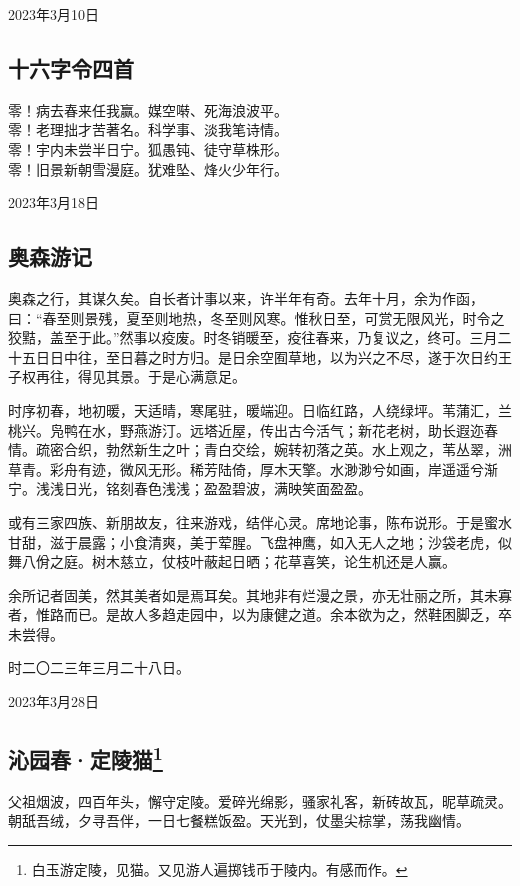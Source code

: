 \documentclass[a5paper]{ctexart}
\begin{document}
	\hfill 2023年3月10日
	
	
	\subsection{十六字令四首}
	\begin{center}
		零！病去春来任我赢。媒空啭、死海浪波平。\\
		零！老理拙才苦著名。科学事、淡我笔诗情。\\
		零！宇内未尝半日宁。狐愚钝、徒守草株形。\\
		零！旧景新朝雪漫庭。犹难坠、烽火少年行。
		
	\end{center}
	\hfill 2023年3月18日
	
	\subsection{奥森游记}
	奥森之行，其谋久矣。自长者计事以来，许半年有奇。去年十月，余为作函，曰：“春至则景残，夏至则地热，冬至则风寒。惟秋日至，可赏无限风光，时令之狡黠，盖至于此。”然事以疫废。时冬销暖至，疫往春来，乃复议之，终可。三月二十五日日中往，至日暮之时方归。是日余空囿草地，以为兴之不尽，遂于次日约王子权再往，得见其景。于是心满意足。
	
	时序初春，地初暖，天适晴，寒尾驻，暖端迎。日临红路，人绕绿坪。苇蒲汇，兰桃兴。凫鸭在水，野燕游汀。远塔近屋，传出古今活气；新花老树，助长遐迩春情。疏密合织，勃然新生之叶；青白交绘，婉转初落之英。水上观之，苇丛翠，洲草青。彩舟有迹，微风无形。稀芳陆倚，厚木天擎。水渺渺兮如画，岸遥遥兮渐宁。浅浅日光，铭刻春色浅浅；盈盈碧波，满映笑面盈盈。
	
	或有三家四族、新朋故友，往来游戏，结伴心灵。席地论事，陈布说形。于是蜜水甘甜，滋于晨露；小食清爽，美于荤腥。飞盘神鹰，如入无人之地；沙袋老虎，似舞八佾之庭。树木慈立，仗枝叶蔽起日晒；花草喜笑，论生机还是人赢。
	
	余所记者固美，然其美者如是焉耳矣。其地非有烂漫之景，亦无壮丽之所，其未寡者，惟路而已。是故人多趋走园中，以为康健之道。余本欲为之，然鞋困脚乏，卒未尝得。
	
	时二〇二三年三月二十八日。
	\begin{flushright}
		2023年3月28日
	\end{flushright}
	
	\subsection[沁园春·定陵猫]{沁园春·定陵猫\footnote{白玉游定陵，见猫。又见游人遍掷钱币于陵内。有感而作。}}
	父祖烟波，四百年头，懈守定陵。爱碎光绵影，骚家礼客，新砖故瓦，昵草疏灵。朝舐吾绒，夕寻吾伴，一日七餐糕饭盈。天光到，仗墨尖棕掌，荡我幽情。
	
\end{document}
